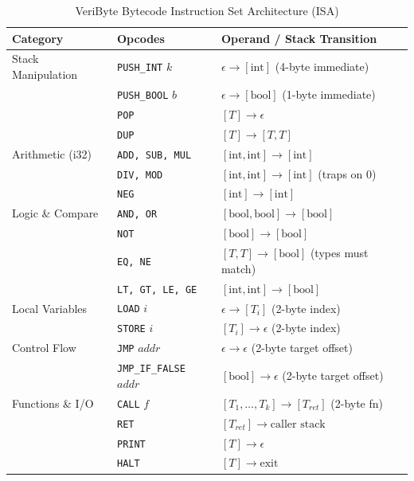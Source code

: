 \documentclass[conference]{IEEEtran}
\begin{document}
\begin{table}[htbp]
\caption{VeriByte Bytecode Instruction Set Architecture (ISA)}
\label{tab:isa}
\centering
\begin{tabular}{llp{4.2cm}}
\toprule
\textbf{Category} & \textbf{Opcodes} & \textbf{Operand / Stack Transition} \\
\midrule
Stack Manipulation & \texttt{PUSH\_INT} $k$ & $\epsilon \to [\text{int}]$ (4-byte immediate) \\
                   & \texttt{PUSH\_BOOL} $b$ & $\epsilon \to [\text{bool}]$ (1-byte immediate) \\
                   & \texttt{POP} & $[T] \to \epsilon$ \\
                   & \texttt{DUP} & $[T] \to [T, T]$ \\
\midrule
Arithmetic (i32)   & \texttt{ADD, SUB, MUL} & $[\text{int}, \text{int}] \to [\text{int}]$ \\
                   & \texttt{DIV, MOD} & $[\text{int}, \text{int}] \to [\text{int}]$ (traps on 0) \\
                   & \texttt{NEG} & $[\text{int}] \to [\text{int}]$ \\
\midrule
Logic \& Compare   & \texttt{AND, OR} & $[\text{bool}, \text{bool}] \to [\text{bool}]$ \\
                   & \texttt{NOT} & $[\text{bool}] \to [\text{bool}]$ \\
                   & \texttt{EQ, NE} & $[T, T] \to [\text{bool}]$ (types must match) \\
                   & \texttt{LT, GT, LE, GE} & $[\text{int}, \text{int}] \to [\text{bool}]$ \\
\midrule
Local Variables    & \texttt{LOAD} $i$ & $\epsilon \to [T_i]$ (2-byte index) \\
                   & \texttt{STORE} $i$ & $[T_i] \to \epsilon$ (2-byte index) \\
\midrule
Control Flow       & \texttt{JMP} $addr$ & $\epsilon \to \epsilon$ (2-byte target offset) \\
                   & \texttt{JMP\_IF\_FALSE} $addr$ & $[\text{bool}] \to \epsilon$ (2-byte target offset) \\
\midrule
Functions \& I/O   & \texttt{CALL} $f$ & $[T_1, \dots, T_k] \to [T_{ret}]$ (2-byte fn) \\
                   & \texttt{RET} & $[T_{ret}] \to \text{caller stack}$ \\
                   & \texttt{PRINT} & $[T] \to \epsilon$ \\
                   & \texttt{HALT} & $[T] \to \text{exit}$ \\
\bottomrule
\end{tabular}
\end{table}
\end{document}
